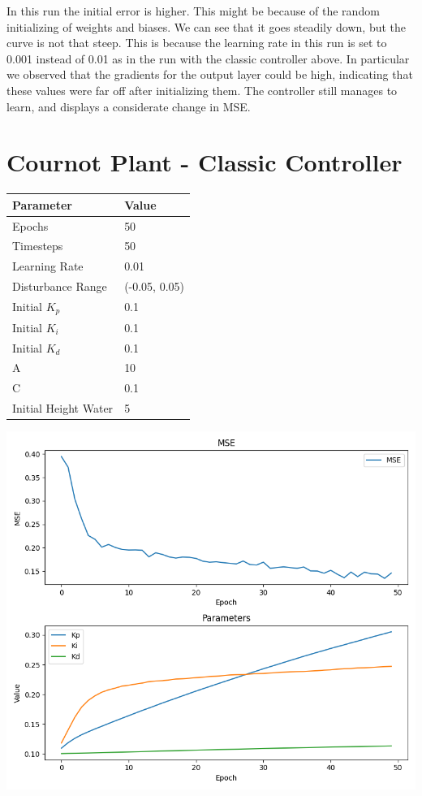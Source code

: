 \documentclass[12pt]{article}
\begin{document}
In this run the initial error is higher. This might be because of the random initializing of weights and biases.
We can see that it goes steadily down, but the curve is not that steep. This is because the learning rate in this run is set
to 0.001 instead of 0.01 as in the run with the classic controller above. In particular we observed that the gradients for the
output layer could be high, indicating that these values were far off after initializing them. The controller still manages
to learn, and displays a considerate change in MSE.

\section*{Cournot Plant - Classic Controller}

\begin{tabular}{|l|l|}
    \hline
    \textbf{Parameter}   & \textbf{Value}\\ \hline
    Epochs               & 50            \\ \hline
    Timesteps            & 50            \\ \hline
    Learning Rate        & 0.01          \\ \hline
    Disturbance Range    & (-0.05, 0.05) \\ \hline
    Initial $K_p$           & 0.1           \\ \hline
    Initial $K_i$           & 0.1           \\ \hline
    Initial $K_d$           & 0.1           \\ \hline
    A                    & 10            \\ \hline
    C                    & 0.1           \\ \hline
    Initial Height Water & 5             \\ \hline
\end{tabular}

\begin{center}
    \includegraphics[width=0.8\linewidth]{figures/bathtub-classic.png}
\end{center}
\end{document}
